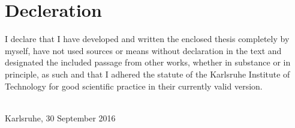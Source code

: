 \thispagestyle{empty}


\vspace*{8cm}


\section*{Decleration}

 I declare that I have developed and written the enclosed thesis completely by myself, have not used sources or means without declaration in the text and designated the included passage from other works, whether in substance or in principle, as such and that I adhered the statute of the Karlsruhe Institute of Technology for good scientific practice in their currently valid version.


~\\[2ex] 
\noindent
Karlsruhe, 30 September 2016
~\\[5ex]
